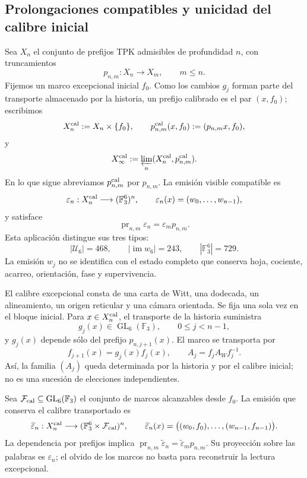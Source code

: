 \subsection{Prolongaciones compatibles y unicidad del calibre inicial}

Sea \(X_n\) el conjunto de prefijos TPK admisibles de profundidad \(n\), con
truncamientos
\[
p_{n,m}:X_n\longrightarrow X_m,\qquad m\leq n.
\]
Fijemos un marco excepcional inicial \(f_0\). Como los cambios \(g_j\) forman
parte del transporte almacenado por la historia, un prefijo calibrado es el
par \((x,f_0)\); escribimos
\[
 X_n^{\rm cal}:=X_n\times\{f_0\},\qquad
 p_{n,m}^{\rm cal}(x,f_0):=(p_{n,m}x,f_0),
\]
y
\[
 X_\infty^{\rm cal}
 :=\varprojlim_n(X_n^{\rm cal},p_{n,m}^{\rm cal}).
\]
En lo que sigue abreviamos \(p_{n,m}^{\rm cal}\) por \(p_{n,m}\).
La emisión visible compatible es
\[
\varepsilon_n:X_n^{\rm cal}\longrightarrow(\mathbb F_3^6)^n,
\qquad
\varepsilon_n(x)=(w_0,\ldots,w_{n-1}),
\]
y satisface
\[
\operatorname{pr}_{n,m}\varepsilon_n
=\varepsilon_m p_{n,m}.
\]
Esta aplicación distingue sus tres tipos:
\[
|\mathcal U_6|=468,\qquad
|\operatorname{im}w_6|=243,\qquad
|\mathbb F_3^6|=729.
\]
La emisión \(w_j\) no se identifica con el estado completo que conserva
hoja, cociente, acarreo, orientación, fase y supervivencia.

El calibre excepcional consta de una carta de Witt, una dodecada, un
alineamiento, un origen reticular y una cámara orientada. Se fija una sola
vez en el bloque inicial. Para
\(x\in X_n^{\rm cal}\), el transporte de la historia suministra
\[
 g_j(x)\in\operatorname{GL}_6(\mathbb F_3),
 \qquad 0\le j<n-1,
\]
y \(g_j(x)\) depende sólo del prefijo
\(p_{n,j+1}(x)\). El marco se transporta por
\[
 f_{j+1}(x)=g_j(x)f_j(x),\qquad
 A_j=f_jA_Wf_j^{-1}.
\]
Así, la familia \((A_j)\) queda determinada por la historia y por el calibre
inicial; no es una sucesión de elecciones independientes.

Sea \(\mathcal F_{\rm cal}\subseteq\operatorname{GL}_6(\mathbb F_3)\) el
conjunto de marcos alcanzables desde \(f_0\). La emisión que conserva el
calibre transportado es
\[
 \widetilde\varepsilon_n:X_n^{\rm cal}
 \longrightarrow(\mathbb F_3^6\times\mathcal F_{\rm cal})^n,
 \qquad
 \widetilde\varepsilon_n(x)
 =\bigl((w_0,f_0),\ldots,(w_{n-1},f_{n-1})\bigr).
\]
La dependencia por prefijos implica
\(\operatorname{pr}_{n,m}\widetilde\varepsilon_n
=\widetilde\varepsilon_m p_{n,m}\). Su proyección sobre las palabras es
\(\varepsilon_n\); el olvido de los marcos no basta para reconstruir la
lectura excepcional.

